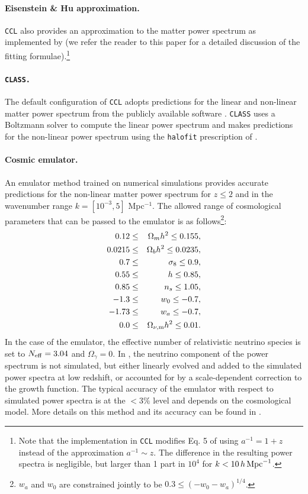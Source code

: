 \documentclass[\docopts]{\docclass}
\newcommand{\ccl}{{\tt CCL}\xspace}
\newcommand{\halofit}{{\tt halofit}\xspace}
\newcommand{\class}{{\tt CLASS}\xspace}
\begin{document}
\paragraph{\bf Eisenstein \& Hu approximation.} \ccl also provides an approximation to the matter power spectrum as implemented by \citet{1998ApJ...496..605E} (we refer the reader to this paper for a detailed discussion of the fitting formulae).\footnote{Note that the implementation in \ccl modifies Eq. 5 of \citet{1998ApJ...496..605E} using $a^{-1}=1+z$ instead of the approximation $a^{-1}\sim z$. The difference in the resulting power spectra is negligible, but larger than 1 part in $10^4$ for $k<10\,h\,{\rm Mpc}^{-1}$.}

\paragraph{\bf \tt CLASS.} The default configuration of \ccl adopts predictions for the linear and non-linear matter power spectrum from the publicly available software \citep{class}. \class uses a Boltzmann solver to compute the linear power spectrum and makes predictions for the non-linear power spectrum using the \halofit prescription of \cite{CLASS_halofit}.

\paragraph{\bf Cosmic emulator.} An emulator method trained on numerical simulations \citep{Lawrence17} provides accurate predictions for the non-linear matter power spectrum for $z\leq 2$ and in the wavenumber range $k=[10^{-3},5]$ Mpc$^{-1}$. The allowed range of cosmological parameters that can be passed to the emulator is as follows\footnote{$w_a$ and $w_0$ are constrained jointly to be $0.3\leq (-w_0-w_a)^{1/4}$.}:
 \begin{eqnarray}
 0.12&\leq& \Omega_{m} h^2 \leq 0.155,\nonumber\\
 0.0215&\leq& \Omega_{b} h^2 \leq 0.0235,\nonumber\\
 0.7&\leq& \sigma_8 \leq 0.9,\nonumber\\
 0.55&\leq& h \leq 0.85,\nonumber\\
 0.85&\leq& n_s\leq 1.05,\nonumber\\
 -1.3&\leq& w_0\leq-0.7,\nonumber\\
 -1.73&\leq& w_a\leq -0.7,\nonumber\\
 0.0&\leq& \Omega_{\nu, {\rm m}} h^2 \leq 0.01.
 \end{eqnarray}
In the case of the emulator, the effective number of relativistic neutrino species is set to $N_{\rm eff}=3.04$ and $\Omega_\gamma=0$. In \citet{Lawrence17}, the neutrino component of the power spectrum is not simulated, but either linearly evolved and added to the simulated power spectra at low redshift, or accounted for by a scale-dependent correction to the growth function. The typical accuracy of the emulator with respect to simulated power spectra is at the $<3\%$ level and depends on the cosmological model. More details on this method and its accuracy can be found in \citet{Upadhye14,Castorina15,Heitmann16}.
 
\end{document}
